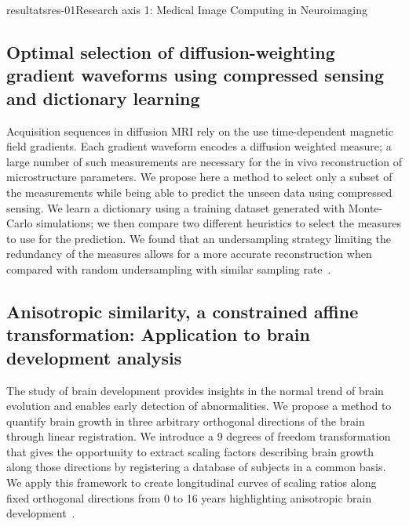 \documentclass{ra2018}
\begin{document}
\begin{module}{resultats}{res-01}{Research axis 1: Medical Image Computing in Neuroimaging}
\subsection{Optimal selection of diffusion-weighting gradient waveforms using compressed sensing and dictionary learning}
\begin{participants}
\end{participants}
Acquisition sequences in diffusion MRI rely on the use time-dependent magnetic field gradients. Each gradient waveform encodes a diffusion weighted measure; a large number of such measurements are necessary for the in vivo reconstruction of microstructure parameters. We propose here a method to select only a subset of the measurements while being able to predict the unseen data using compressed sensing. We learn a dictionary using a training dataset generated with Monte-Carlo simulations; we then compare two different heuristics to select the measures to use for the prediction. We found that an undersampling strategy limiting the redundancy of the measures allows for a more accurate reconstruction when compared with random undersampling with similar sampling rate~\cite{truffet:inserm-01939066}.

\subsection{Anisotropic similarity, a constrained affine transformation: Application to brain development analysis}
\begin{participants}
\end{participants}
The study of brain development provides insights in the normal trend of brain evolution and enables early detection of abnormalities. We propose a method to quantify brain growth in three arbitrary orthogonal directions of the brain through linear registration. We introduce a 9 degrees of freedom transformation that gives the opportunity to extract scaling factors describing brain growth along those directions by registering a database of subjects in a common basis. We apply this framework to create longitudinal curves of scaling ratios along fixed orthogonal directions from 0 to 16 years highlighting anisotropic brain development~\cite{legouhy:inserm-01871274}.


\end{module}
\end{document}

